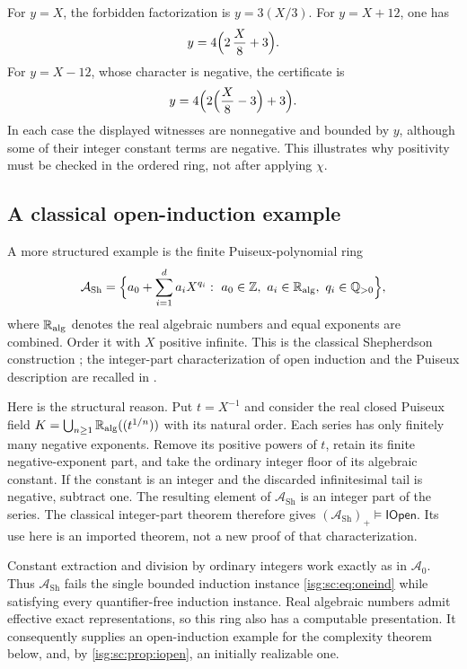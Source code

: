 \documentclass[11pt]{article}
\theoremstyle{definition}
\theoremstyle{remark}
\newcommand{\R}{\mathbb{R}}
\newcommand{\Z}{\mathbb{Z}}
\newcommand{\Q}{\mathbb{Q}}
\newcommand{\Iopen}{\mathsf{IOpen}}
\newcommand{\Asc}{\mathcal{A}}
\begin{document}
\begin{example}\label{isg:sc:ex:certificates}
For $y=X$, the forbidden factorization is $y=3(X/3)$. For $y=X+12$, one
has
\[
 y=4\Bigl(2\,\frac{X}{8}+3\Bigr).
\]
For $y=X-12$, whose character is negative, the certificate is
\[
 y=4\Bigl(2\Bigl(\frac{X}{8}-3\Bigr)+3\Bigr).
\]
In each case the displayed witnesses are nonnegative and bounded by $y$,
although some of their integer constant terms are negative. This
illustrates why positivity must be checked in the ordered ring, not after
applying $\chi$.
\end{example}

\subsection{A classical open-induction example}\label{isg:sc:sec:shepherdson}
A more structured example is the finite Puiseux-polynomial ring
\[
 \Asc_{\mathrm{Sh}}=\Bigl\{a_0+\sum_{i=1}^d a_iX^{q_i}:\
 a_0\in\Z,\ a_i\in\R_{\rm alg},\ q_i\in\Q_{>0}\Bigr\},
\]
where $\R_{\rm alg}$ denotes the real algebraic numbers and equal
exponents are combined. Order it with $X$ positive infinite. This is the
classical Shepherdson construction \cite{Shepherdson}; the integer-part
characterization of open induction and the Puiseux description are
recalled in \cite{Raffer}.

Here is the structural reason. Put $t=X^{-1}$ and consider the real closed
Puiseux field $K=\bigcup_{n\ge1}\R_{\rm alg}((t^{1/n}))$ with its natural
order. Each series has only finitely many negative exponents. Remove its
positive powers of $t$, retain its finite negative-exponent part, and take
the ordinary integer floor of its algebraic constant. If the constant is an
integer and the discarded infinitesimal tail is negative, subtract one.
The resulting element of $\Asc_{\mathrm{Sh}}$ is an integer part of the
series. The classical integer-part theorem therefore gives
$(\Asc_{\mathrm{Sh}})_+\models\Iopen$. Its use here is an imported
theorem, not a new proof of that characterization.

Constant extraction and division by ordinary integers work exactly as in
$\Asc_0$. Thus $\Asc_{\mathrm{Sh}}$ fails the single bounded induction
instance \eqref{isg:sc:eq:oneind} while satisfying every quantifier-free
induction instance. Real algebraic numbers admit effective exact
representations, so this ring also has a computable presentation. It
consequently supplies an open-induction example for the complexity theorem
below, and, by \cref{isg:sc:prop:iopen}, an initially realizable one.
\end{document}
